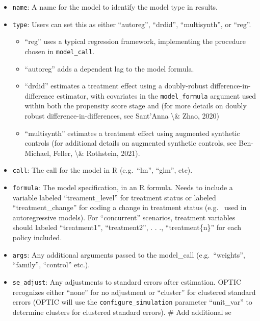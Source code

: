 \documentclass[
]{article}
\begin{document}
\begin{itemize}
\item
  \texttt{name}: A name for the model to identify the model type in
  results.
\item
  \texttt{type}: Users can set this as either ``autoreg'', ``drdid'',
  ``multisynth'', or ``reg''.

  \begin{itemize}
  \item
    ``reg'' uses a typical regression framework, implementing the
    procedure chosen in \texttt{model\_call}.
  \item
    ``autoreg'' adds a dependent lag to the model formula.
  \item
    ``drdid'' estimates a treatment effect using a doubly-robust
    difference-in-difference estimator, with covariates in the
    \texttt{model\_formula} argument used within both the propensity
    score stage and (for more details on doubly robust
    difference-in-differences, see Sant'Anna \textbackslash\& Zhao,
    2020)
  \item
    ``multisynth'' estimates a treatment effect using augmented
    synthetic controls (for additional details on augmented synthetic
    controls, see Ben-Michael, Feller, \textbackslash\& Rothstein,
    2021).
  \end{itemize}
\item
  \texttt{call}: The call for the model in R (e.g.~``lm'', ``glm'',
  etc).
\item
  \texttt{formula}: The model specification, in an R formula. Needs to
  include a variable labeled ``treament\_level'' for treatment status or
  labeled ``treatment\_change'' for coding a change in treatment status
  (e.g.~ used in autoregressive models). For ``concurrent'' scenarios,
  treatment variables should labeled ``treatment1'', ``treatment2'', . .
  ., ``treatment\{n\}'' for each policy included.
\item
  \texttt{args}: Any additional arguments passed to the model\_call
  (e.g.~``weights'', ``family'', ``control'' etc.).
\item
  \texttt{se\_adjust}: Any adjustments to standard errors after
  estimation. OPTIC recognizes either ``none'' for no adjustment or
  ``cluster'' for clustered standard errors (OPTIC will use the
  \texttt{configure\_simulation} parameter ``unit\_var'' to determine
  clusters for clustered standard errors). \# Add additional se
\end{itemize}
\end{document}
